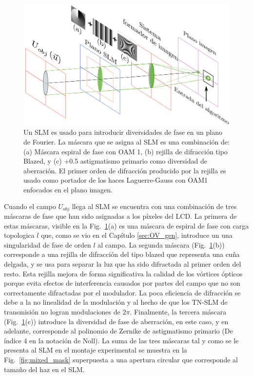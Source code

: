 \begin{figure}[h!]
\centering
\includegraphics[scale=.5]{PhaseDiversitySetup_esp.pdf}
\caption[Diagrama del sistema óptico para PD con iluminación coherente.]{Un SLM es usado para introducir diversidades de fase en un
  plano de Fourier. La máscara que se asigna al SLM es una combinación de:
  (a) Máscara espiral de fase con OAM 1, (b) rejilla de difracción
  tipo Blazed, y (c) +0.5 astigmatismo primario como diversidad de
  aberración. El primer orden de difracción producido por la rejilla
  es usado como portador de los haces Laguerre-Gauss con OAM1
  enfocados en el plano imagen.} 
\label{fig:set-up}
\end{figure}

Cuando el campo $U_{obj}$ llega al SLM se encuentra con una combinación de tres
máscaras de fase que han sido asignadas a los píxeles del LCD. La
primera de estas máscaras, visible en la Fig.~\ref{fig:set-up}(a)  es una máscara de espiral de fase con carga
topologica $l$ que, como se vio en el Capítulo \ref{sec:OV_gen}, introduce un una
singularidad de fase de orden $l$ al campo. La segunda máscara
(Fig.~\ref{fig:set-up}(b)) corresponde a una rejilla de difracción del tipo
blazed que representa una cuña delgada, y se usa para separar la luz
que ha sido difractada al primer orden del resto. 
Esta rejilla mejora de forma significativa la calidad
de los vórtices ópticos porque evita efectos de interferencia causados
por partes del campo que no son correctamente difractadas por el
modulador. La poca eficiencia de difracción se debe a la no linealidad
de la modulación y al hecho de que los TN-SLM de transmisión no logran
modulaciones de $2\pi$.  Finalmente, la tercera máscara
(Fig.~\ref{fig:set-up}(c)) introduce la diversidad de fase de
aberración, en este caso, y en adelante,  corresponde al polinomio de
Zernike de astigmatismo primario (De índice 4 en la notación de
Noll). La suma de las tres máscaras tal y como se le presenta al SLM
en el montaje experimental se muestra en la Fig.~\ref{fig:mixed_mask} superpuesta a una
apertura circular que corresponde al tamaño del haz en el SLM.   

